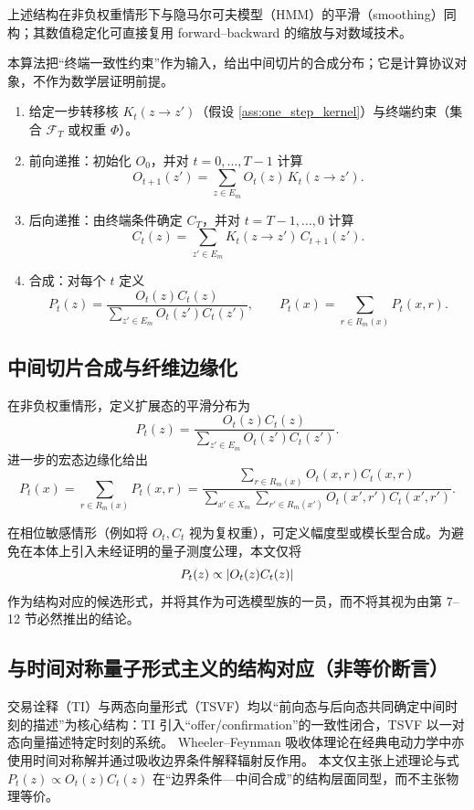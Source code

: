 上述结构在非负权重情形下与隐马尔可夫模型（HMM）的平滑（smoothing）同构；其数值稳定化可直接复用 forward--backward 的缩放与对数域技术。\cite{rabiner_hmm_tutorial}

\begin{algorithm}\label{alg:forward_backward}
\InterfaceTag 本算法把“终端一致性约束”作为输入，给出中间切片的合成分布；它是计算协议对象，不作为数学层证明前提。
\begin{enumerate}
  \item 给定一步转移核 $K_t(z\to z')$（假设 \ref{ass:one_step_kernel}）与终端约束（集合 $\mathcal F_T$ 或权重 $\Phi$）。
  \item 前向递推：初始化 $O_0$，并对 $t=0,\dots,T-1$ 计算
  $$
  O_{t+1}(z')=\sum_{z\in E_m} O_t(z)\,K_t(z\to z').
  $$
  \item 后向递推：由终端条件确定 $C_T$，并对 $t=T-1,\dots,0$ 计算
  $$
  C_t(z)=\sum_{z'\in E_m} K_t(z\to z')\,C_{t+1}(z').
  $$
  \item 合成：对每个 $t$ 定义
  $$
  P_t(z)=\frac{O_t(z)C_t(z)}{\sum_{z'\in E_m}O_t(z')C_t(z')},
  \qquad
  P_t(x)=\sum_{r\in R_m(x)}P_t(x,r).
  $$
\end{enumerate}
\end{algorithm}

\subsection{中间切片合成与纤维边缘化}

在非负权重情形，定义扩展态的平滑分布为
$$
P_t(z)=\frac{O_t(z)C_t(z)}{\sum_{z'\in E_m}O_t(z')C_t(z')}.
$$
进一步的宏态边缘化给出
$$
P_t(x)=\sum_{r\in R_m(x)}P_t(x,r)
=\frac{\sum_{r\in R_m(x)}O_t(x,r)C_t(x,r)}{\sum_{x'\in X_m}\sum_{r'\in R_m(x')}O_t(x',r')C_t(x',r')}.
$$

在相位敏感情形（例如将 $O_t,C_t$ 视为复权重），可定义幅度型或模长型合成。\AuditTag 为避免在本体上引入未经证明的量子测度公理，本文仅将
$$
P_t(z)\propto \left\lvert O_t(z)C_t(z)\right\rvert
$$
作为结构对应的候选形式，并将其作为可选模型族的一员，而不将其视为由第 7--12 节必然推出的结论。

\subsection{与时间对称量子形式主义的结构对应（非等价断言）}

\AuditTag 交易诠释（TI）与两态向量形式（TSVF）均以“前向态与后向态共同确定中间时刻的描述”为核心结构：TI 引入“offer/confirmation”的一致性闭合，TSVF 以一对态向量描述特定时刻的系统。\cite{cramer_transactional_1986,vaidman_tsvf}
Wheeler--Feynman 吸收体理论在经典电动力学中亦使用时间对称解并通过吸收边界条件解释辐射反作用。\cite{wheeler_feynman_1945}
本文仅主张上述理论与式 $P_t(z)\propto O_t(z)C_t(z)$ 在“边界条件—中间合成”的结构层面同型，而不主张物理等价。

